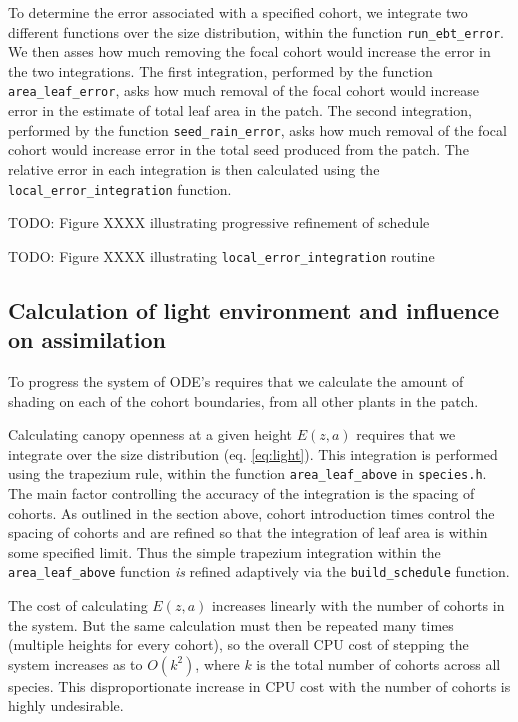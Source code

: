 \documentclass[10pt,twoside]{article}
\begin{document}
To determine the error associated with a specified cohort, we integrate
two different functions over the size distribution, within the function
\texttt{run\_ebt\_error}. We then asses how much removing the focal
cohort would increase the error in the two integrations. The first
integration, performed by the function \texttt{area\_leaf\_error}, asks
how much removal of the focal cohort would increase error in the
estimate of total leaf area in the patch. The second integration,
performed by the function \texttt{seed\_rain\_error}, asks how much
removal of the focal cohort would increase error in the total seed
produced from the patch. The relative error in each integration is then
calculated using the \texttt{local\_error\_integration} function.

TODO: Figure XXXX illustrating progressive refinement of schedule

TODO: Figure XXXX illustrating \texttt{local\_error\_integration}
routine

\subsection{Calculation of light environment and influence on
assimilation}\label{calculation-of-light-environment-and-influence-on-assimilation}

To progress the system of ODE's requires that we calculate the amount of
shading on each of the cohort boundaries, from all other plants in the
patch.

Calculating canopy openness at a given height \(E(z,a)\) requires that
we integrate over the size distribution (eq. \ref{eq:light}). This
integration is performed using the trapezium rule, within the function
\texttt{area\_leaf\_above} in \texttt{species.h}. The main factor
controlling the accuracy of the integration is the spacing of cohorts.
As outlined in the section above, cohort introduction times control the
spacing of cohorts and are refined so that the integration of leaf area
is within some specified limit. Thus the simple trapezium integration
within the \texttt{area\_leaf\_above} function \emph{is} refined
adaptively via the \texttt{build\_schedule} function.

The cost of calculating \(E(z,a)\) increases linearly with the number of
cohorts in the system. But the same calculation must then be repeated
many times (multiple heights for every cohort), so the overall CPU cost
of stepping the system increases as to \(O(k^2)\), where \(k\) is the
total number of cohorts across all species. This disproportionate
increase in CPU cost with the number of cohorts is highly undesirable.
\end{document}
